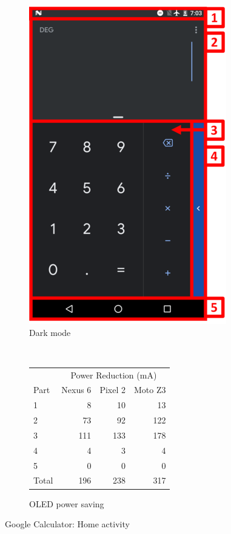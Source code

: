 \begin{figure}[h]
\begin{subfigure}[]{\columnwidth}
		\includegraphics[width=0.27\columnwidth]{./figure/650a_calculator_dark.png}
		\caption{Dark mode}
	\end{subfigure}
	\\
	\begin{subfigure}[]{\columnwidth}
	\centering
	{ \small
	\begin{tabular}{ | l | r | r | r |}
		\hline
		     & \multicolumn{3}{|c|}{Power Reduction (mA)}\\
		\cline{2-4}
                Part   & Nexus 6 & Pixel 2 & Moto Z3 \\
		\hline
		1 &   8 &   10 &   13  \\
		2 &  73 &   92 &  122  \\
		3 & 111 &  133 &  178  \\
		4 &   4 &    3 &    4  \\
		5 &   0 &    0 &    0  \\
		\hline
		Total   & 196 & 238 & 317  \\
		\hline
	\end{tabular}
	}
	\caption{OLED power saving}
        \vspace{-0.1in}
	\end{subfigure}
	\caption{Google Calculator: Home activity}
	\label{fig:case_study_calculator}
\end{figure}

